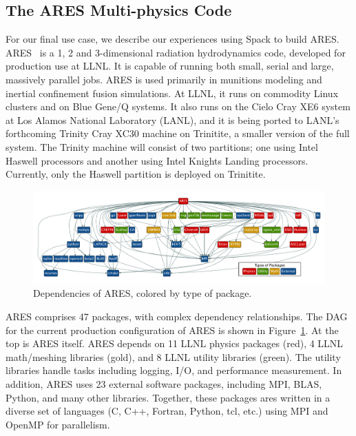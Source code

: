 
\subsection{The ARES Multi-physics Code}
\label{sec:ares}

For our final use case, we describe our experiences using Spack to build ARES.
ARES~\cite{ares1,ares2} is a 1, 2 and 3-dimensional radiation hydrodynamics code,
developed for production use at LLNL.  It is capable of running both small, serial
and large, massively parallel jobs. ARES is used primarily in munitions modeling
and inertial confinement fusion simulations.
%
At LLNL, it runs on commodity Linux clusters and on Blue Gene/Q systems.
It also runs on the Cielo Cray XE6 system at Los Alamos National Laboratory (LANL), and
it is being ported to LANL's forthcoming Trinity Cray XC30 machine on Trinitite,
a smaller version of the full system.  The Trinity machine will consist of two partitions;
one using Intel Haswell processors and another using Intel Knights Landing processors.
Currently, only the Haswell partition is deployed on Trinitite.

\begin{figure}[t]
	\includegraphics[width=\textwidth]{figs/ares-dot/ares-fig.pdf}
	\caption{
		Dependencies of ARES, colored by type of package.
		\label{fig:ares}
	}
\end{figure}

ARES comprises 47 packages, with complex dependency relationships.  The DAG for
the current production configuration of ARES is shown in Figure~\ref{fig:ares}.
At the top is ARES itself.  ARES depends on 11 LLNL physics packages (red),
4 LLNL math/meshing libraries (gold), and 8 LLNL utility libraries (green).
The utility libraries handle tasks including logging, I/O, and performance
measurement. In addition, ARES uses 23 external software packages, including MPI, BLAS,
Python, and many other libraries.  Together, these packages ares written in a diverse
set of languages (C, C++, Fortran, Python, tcl, etc.) using MPI and OpenMP for parallelism.


